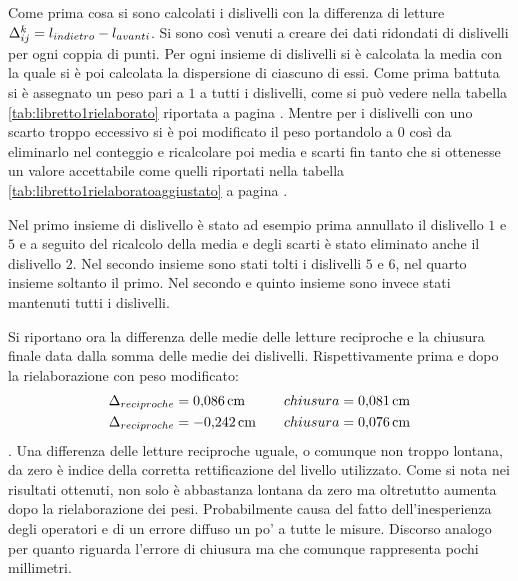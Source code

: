 Come prima cosa si sono calcolati i dislivelli con la differenza di letture $\Delta_{ij}^{k}=\break l_{indietro}-l_{avanti}$. %
Si sono così venuti a creare dei dati ridondati di dislivelli per ogni coppia di punti.
Per ogni insieme di dislivelli si è calcolata la media con la quale si è poi calcolata la dispersione di ciascuno di essi.
Come prima battuta si è assegnato un peso pari a $1$ a tutti i dislivelli, come si può vedere nella tabella \ref{tab:libretto1rielaborato} riportata a pagina \pageref{tab:libretto1rielaborato}.
Mentre per i dislivelli con uno scarto troppo eccessivo si è poi modificato il peso portandolo a $0$ così da eliminarlo nel conteggio e ricalcolare poi media e scarti fin tanto che si ottenesse un valore accettabile come quelli riportati nella tabella \ref{tab:libretto1rielaboratoaggiustato} a pagina \pageref{tab:libretto1rielaboratoaggiustato}.

Nel primo insieme di dislivello è stato ad esempio prima annullato il dislivello $1$ e $5$ e a seguito del ricalcolo della media e degli scarti è stato eliminato anche il dislivello $2$.
Nel secondo insieme sono stati tolti i dislivelli $5$ e $6$, nel quarto insieme soltanto il primo. 
Nel secondo e quinto insieme sono invece stati mantenuti tutti i dislivelli.

Si riportano ora la differenza delle medie delle letture reciproche e la chiusura finale data dalla somma delle medie dei dislivelli. Rispettivamente prima e dopo la rielaborazione con peso modificato:
\begin{align*}
\Delta_{reciproche} &= \SI{0.086}{\centi\metre} \quad & chiusura = \SI{0.081}{\centi\metre} \\
\Delta_{reciproche} &= \SI{-0.242}{\centi\metre} \quad & chiusura = \SI{0.076}{\centi\metre}
\end{align*}.
Una differenza delle letture reciproche uguale, o comunque non troppo lontana, da zero è indice della corretta rettificazione del livello utilizzato. 
Come si nota nei risultati ottenuti, non solo è abbastanza lontana da zero ma oltretutto aumenta dopo la rielaborazione dei pesi. 
Probabilmente causa del fatto dell'inesperienza degli operatori e di un errore diffuso un po' a tutte le misure.
Discorso analogo per quanto riguarda l'errore di chiusura ma che comunque rappresenta pochi millimetri.
%
\clearpage %
